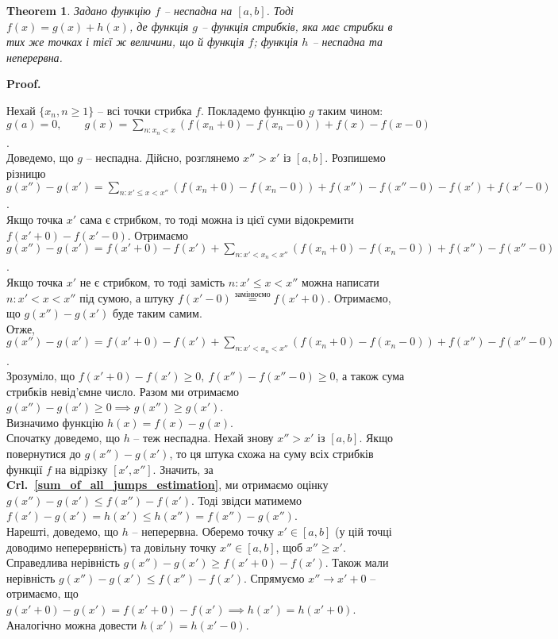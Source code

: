 \documentclass[a4paper, 10pt]{article}
\makeatletter
\def\qed{$\blacksquare$}
\theoremstyle{theoremdd}
\newtheorem{theorem}{Theorem}[subsection]
\theoremstyle{theoremdd}
\theoremstyle{theoremdd}
\theoremstyle{theoremdd}
\theoremstyle{theoremdd}
\theoremstyle{theoremdd}
\theoremstyle{theoremdd}
\theoremstyle{theoremdd}
\theoremstyle{theoremdd}
\newcommand\crlref[1]{\textbf{Crl.~\ref{#1}}}
\renewenvironment{proof}[1][Proof.\\]{\par
\pushQED{\hfill \qed}%
\normalfont \topsep6\p@\@plus6\p@\relax
\trivlist
\item\relax
{\bfseries
#1\@addpunct{.}}\hspace\labelsep\ignorespaces
}{%
\popQED\endtrivlist\@endpefalse
}
\makeatother
\begin{document}
\newpage
\begin{theorem}
Задано функцію $f$ -- неспадна на $[a,b]$. Тоді $f(x) = g(x) + h(x)$, де функція $g$ -- функція стрибків, яка має стрибки в тих же точках і тієї ж величини, що й функція $f$; функція $h$ -- неспадна та неперервна.
\end{theorem}

\begin{proof}
Нехай $\{x_n, n \geq 1\}$ -- всі точки стрибка $f$.  Покладемо функцію $g$ таким чином:\\ $g(a) = 0, \qquad g(x) = \displaystyle\sum_{n: x_n < x}( f(x_n+0) - f(x_n-0)) + f(x) - f(x-0)$.\\
Доведемо, що $g$ -- неспадна. Дійсно, розглянемо $x'' > x'$ із $[a,b]$. Розпишемо різницю\\
$g(x'')-g(x') = \displaystyle\sum_{n: x' \leq x < x''} (f(x_n+0) - f(x_n-0)) + f(x'') - f(x''-0) - f(x') + f(x'-0)$.\\
Якщо точка $x'$ сама є стрибком, то тоді можна із цієї суми відокремити $f(x'+0) - f(x'-0)$. Отримаємо $g(x'')-g(x') = f(x'+0) - f(x') + \displaystyle\sum_{n: x' < x_n < x''} (f(x_n+0) - f(x_n-0)) + f(x'') - f(x''-0)$.\\
Якщо точка $x'$ не є стрибком, то тоді замість $n: x' \leq x < x''$ можна написати $n: x' < x < x''$ під сумою, а штуку $f(x'-0) \overset{\text{замінюємо}}{=} f(x'+0)$. Отримаємо, що $g(x'') - g(x')$ буде таким самим.\\
Отже, $g(x'')-g(x') = f(x'+0) - f(x') + \displaystyle\sum_{n: x' < x_n < x''} (f(x_n+0) - f(x_n-0)) + f(x'') - f(x''-0)$. \\
Зрозуміло, що $f(x'+0) - f(x') \geq 0,\ f(x'') - f(x''-0) \geq 0$, а також сума стрибків невід'ємне число. Разом ми отримаємо $g(x'') - g(x') \geq 0 \implies g(x'') \geq g(x')$.
\bigskip \\
Визначимо функцію $h(x) = f(x) - g(x)$.\\
Спочатку доведемо, що $h$ -- теж неспадна. Нехай знову $x'' > x'$ із $[a,b]$. Якщо повернутися до $g(x'') - g(x')$, то ця штука схожа на суму всіх стрибків функції $f$ на відрізку $[x',x'']$. Значить, за \crlref{sum_of_all_jumps_estimation}, ми отримаємо оцінку $g(x'') - g(x') \leq f(x'') - f(x')$. Тоді звідси матимемо $f(x') - g(x') = h(x') \leq h(x'') = f(x'') - g(x'')$. \\
Нарешті, доведемо, що $h$ -- неперервна. Оберемо точку $x' \in [a,b]$ (у цій точці доводимо неперервність) та довільну точку $x'' \in [a,b]$, щоб $x'' \geq x'$. Справедлива нерівність $g(x'') - g(x') \geq f(x'+0) - f(x')$. Також мали нерівність $g(x'') - g(x') \leq f(x'') - f(x')$. Спрямуємо $x'' \to x'+0$ -- отримаємо, що $g(x'+0) - g(x') = f(x'+0) - f(x') \implies h(x') = h(x'+0)$. Аналогічно можна довести $h(x') = h(x'-0)$.
\end{proof}
\end{document}
